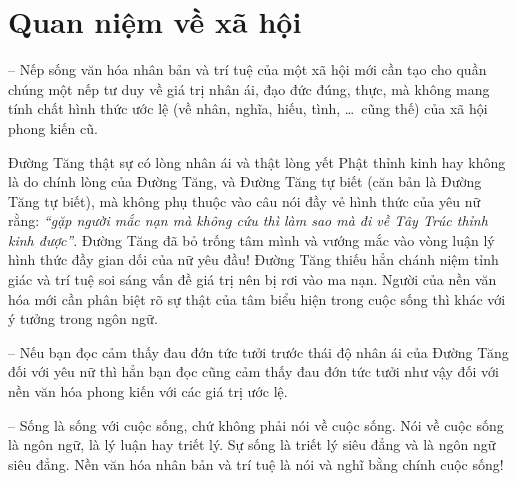 \section{Quan niệm về xã hội} %
\label{sec:80_81_xa_hoi}

-- Nếp sống văn hóa nhân bản và trí tuệ của một xã hội mới cần tạo cho quần chúng một nếp tư duy về giá trị nhân ái, đạo đức đúng, thực, mà không mang tính chất hình thức ước lệ (về nhân, nghĩa, hiếu, tình, \ldots ~cũng thế) của xã hội phong kiến cũ.

Đường Tăng thật sự có lòng nhân ái và thật lòng yết Phật thỉnh kinh hay không là do chính lòng của Đường Tăng, và Đường Tăng tự biết (căn bản là Đường Tăng tự biết), mà không phụ thuộc vào câu nói đầy vẻ hình thức của yêu nữ rằng: \emph{``gặp người mắc nạn mà không cứu thì làm sao mà đi về Tây Trúc thỉnh kinh được''}. Đường Tăng đã bỏ trống tâm mình và vướng mắc vào vòng luận lý hình thức đầy gian dối của nữ yêu đầu! Đường Tăng thiếu hẳn chánh niệm tỉnh giác và trí tuệ soi sáng vấn đề giá trị nên bị rơi vào ma nạn. Người của nền văn hóa mới cần phân biệt rõ sự thật của tâm biểu hiện trong cuộc sống thì khác với ý tưởng trong ngôn ngữ.

-- Nếu bạn đọc cảm thấy đau đớn tức tưởi trước thái độ nhân ái của Đường Tăng đối với yêu nữ thì hẳn bạn đọc cũng cảm thấy đau đớn tức tưởi như vậy đối với nền văn hóa phong kiến với các giá trị ước lệ.

-- Sống là sống với cuộc sống, chứ không phải nói về cuộc sống. Nói về cuộc sống là ngôn ngữ, là lý luận hay triết lý. Sự sống là triết lý siêu đẳng và là ngôn ngữ siêu đẳng. Nền văn hóa nhân bản và trí tuệ là nói và nghĩ bằng chính cuộc sống!
